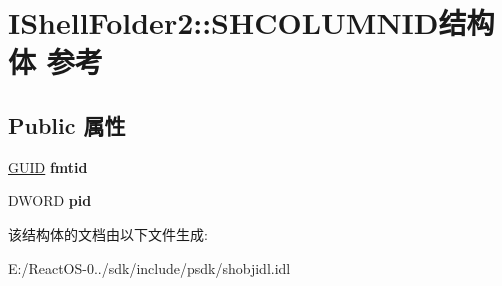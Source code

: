 \hypertarget{struct_i_shell_folder2_1_1_s_h_c_o_l_u_m_n_i_d}{}\section{I\+Shell\+Folder2\+:\+:S\+H\+C\+O\+L\+U\+M\+N\+I\+D结构体 参考}
\label{struct_i_shell_folder2_1_1_s_h_c_o_l_u_m_n_i_d}
\subsection*{Public 属性}
\begin{DoxyCompactItemize}
\item 
\mbox{\label{struct_i_shell_folder2_1_1_s_h_c_o_l_u_m_n_i_d_aa29625aa2e6a9f5db64b7ea7ec0adac9}} 
\hyperlink{interface_g_u_i_d}{G\+U\+ID} {\bfseries fmtid}
\item 
\mbox{\label{struct_i_shell_folder2_1_1_s_h_c_o_l_u_m_n_i_d_a7f31be0e393df4d8e2cb7ae744afea81}} 
D\+W\+O\+RD {\bfseries pid}
\end{DoxyCompactItemize}


该结构体的文档由以下文件生成\+:\begin{DoxyCompactItemize}
\item 
E\+:/\+React\+O\+S-\/0../sdk/include/psdk/shobjidl.\+idl\end{DoxyCompactItemize}
